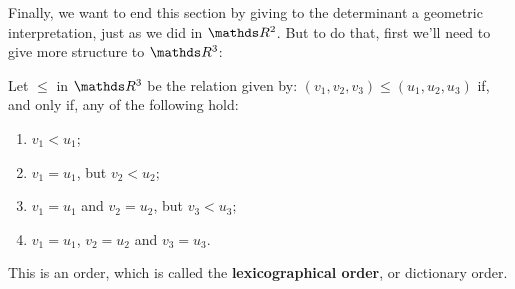 Finally, we want to end this section by giving to the determinant a geometric interpretation, just as we did in $\R^2$. But to do that, first we'll need to give more structure to $\R^3$:

\begin{df}
	Let $\leq$ in $\R^3$ be the relation given by: $(v_1,v_2,v_3)\leq (u_1,u_2,u_3)$ if, and only if, any of the following hold:
	\begin{enumerate}[(1)]		
		\item $v_1< u_1$;
		\item $v_1=u_1$, but $v_2< u_2$;
		\item $v_1=u_1$ and $v_2=u_2$, but $v_3< u_3$;
		\item $v_1=u_1$, $v_2=u_2$ and $v_3=u_3$.
	\end{enumerate}

	This is an order, which is called the \textbf{lexicographical order}, or dictionary order.
\end{df}

